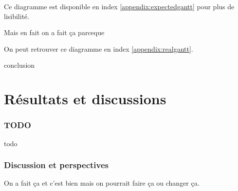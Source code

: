 \documentclass[a4paper]{article}
\begin{document}
Ce diagramme est disponible en index \ref{appendix:expectedgantt} pour
plus de lisibilité.


Mais en fait on a fait ça parceque

On peut retrouver ce diagramme en index \ref{appendix:realgantt}.


conclusion


\clearpage
\part{Résultats et discussions}

\section{TODO}

todo

\clearpage
\section{Discussion et perspectives}

On a fait ça et c'est bien mais on pourrait faire ça ou changer ça.
\end{document}
